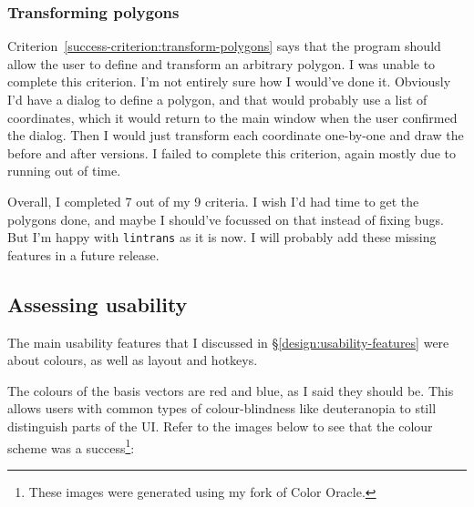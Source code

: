\documentclass[../main.tex]{subfiles}
\begin{document}
\subsubsection{Transforming polygons\label{evaluation:evaluating-success-criteria:transform-polygons}}

Criterion~\ref{success-criterion:transform-polygons} says that the program should allow the user to define and transform an arbitrary polygon. I was unable to complete this criterion. I'm not entirely sure how I would've done it. Obviously I'd have a dialog to define a polygon, and that would probably use a list of coordinates, which it would return to the main window when the user confirmed the dialog. Then I would just transform each coordinate one-by-one and draw the before and after versions. I failed to complete this criterion, again mostly due to running out of time.

Overall, I completed 7 out of my 9 criteria. I wish I'd had time to get the polygons done, and maybe I should've focussed on that instead of fixing bugs. But I'm happy with \texttt{lintrans} as it is now. I will probably add these missing features in a future release.

\subsection{Assessing usability\label{evaluation:assessing-usability}}

The main usability features that I discussed in \S\ref{design:usability-features} were about colours, as well as layout and hotkeys.

The colours of the basis vectors are red and blue, as I said they should be. This allows users with common types of colour-blindness like deuteranopia to still distinguish parts of the UI. Refer to the images below to see that the colour scheme was a success\footnote{These images were generated using my fork of Color Oracle\cite{color-oracle-my-fork}.}:
\end{document}
